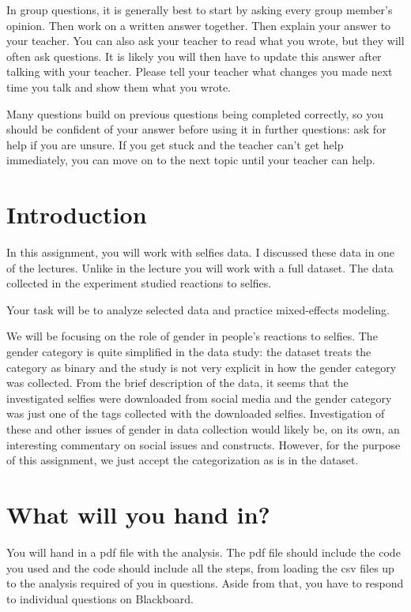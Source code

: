 \documentclass{article}\usepackage[]{graphicx}\usepackage[]{color}
\begin{document}
In group questions, it is generally best to start by asking every group member's opinion. Then work on a written answer together. Then explain your answer to your teacher. You can also ask your teacher to read what you wrote, but they will often ask questions. It is likely you will then have to update this answer after talking with your teacher. Please tell your teacher what changes you made next time you talk and show them what you wrote.

Many questions build on previous questions being completed correctly, so you should be confident of your answer before using it in further questions: ask for help if you are unsure. If you get stuck and the teacher can't get help immediately, you can move on to the next topic until your teacher can help.

\section{Introduction}

In this assignment, you will work with selfies data. I discussed these data in one of the lectures. Unlike in the lecture you will work with a full dataset. The data collected in the experiment studied reactions to selfies.

Your task will be to analyze selected data and practice mixed-effects modeling.

We will be focusing on the role of gender in people's reactions to selfies. The gender category is quite simplified in the data study: the dataset treats the category as binary and the study is not very explicit in how the gender category was collected. From the brief description of the data, it seems that the investigated selfies were downloaded from social media and the gender category was just one of the tags collected with the downloaded selfies. Investigation of these and other issues of gender in data collection would likely be, on its own, an interesting commentary on social issues and constructs. However, for the purpose of this assignment, we just accept the categorization as is in the dataset.

\section{What will you hand in?}

You will hand in a pdf file with the analysis. The pdf file should include the
code you used and the code should include all the steps, from loading the csv files up to the analysis required of you in questions. Aside from that, you have to respond to individual questions on Blackboard.
\end{document}
